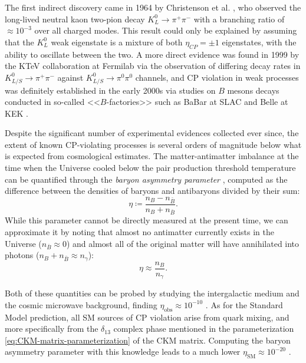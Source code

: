 The first indirect discovery came in 1964 by Christenson et al. \cite{kaoncpv}, who observed the long-lived neutral kaon two-pion decay $K_L^0 \rightarrow \pi^+ \pi^-$ with a branching ratio of $\approx {10}^{-3}$ over all charged modes.
This result could only be explained by assuming that the $K_L^0$ weak eigenstate is a mixture of both $\eta_{CP}=\pm1$ eigenstates, with the ability to oscillate between the two.
A more direct evidence was found in 1999 by the KTeV collaboration at Fermilab \cite{ktevcpv} via the observation of differing decay rates in $K_{L/S}^0 \rightarrow \pi^+ \pi^-$ against $K_{L/S}^0 \rightarrow \pi^0 \pi^0$ channels, and CP violation in weak processes was definitely established in the early 2000s via studies on $B$ mesons decays conducted in so-called <<$B$-factories>> such as BaBar at SLAC \cite{babarcpv} and Belle at KEK \cite{bellecpv}.

Despite the significant number of experimental evidences collected ever since, the extent of known CP-violating processes is several orders of magnitude below what is expected from cosmological estimates.
The matter-antimatter imbalance at the time when the Universe cooled below the pair production threshold temperature can be quantified through the \textit{baryon asymmetry parameter} \cite{Canetti2012}, computed as the difference between the densities of baryons and antibaryons divided by their sum:
\begin{equation}
\eta \coloneqq \frac{n_B - n_{\bar{B}}}{n_B + n_{\bar{B}}}.
\end{equation}
While this parameter cannot be directly measured at the present time, we can approximate it by noting that almost no antimatter currently exists in the Universe ($n_{\bar{B}} \approx 0$) and almost all of the original matter will have annihilated into photons ($n_B + n_{\bar{B}} \approx n_\gamma$):
\begin{equation}
\eta \approx \frac{n_B}{n_\gamma}.
\end{equation}

Both of these quantities can be probed by studying the intergalactic medium and the cosmic microwave background, finding  $\eta_\text{obs} \approx {10}^{-10}$ \cite{Steigman2007}.
As for the Standard Model prediction, all SM sources of CP violation arise from quark mixing, and more specifically from the $\delta_{13}$ complex phase mentioned in the parameterization \eqref{eq:CKM-matrix-parameterization} of the CKM matrix.
Computing the baryon asymmetry parameter with this knowledge leads to a much lower $\eta_\text{SM} \approx {10}^{-20}$ \cite{Canetti2012}.

